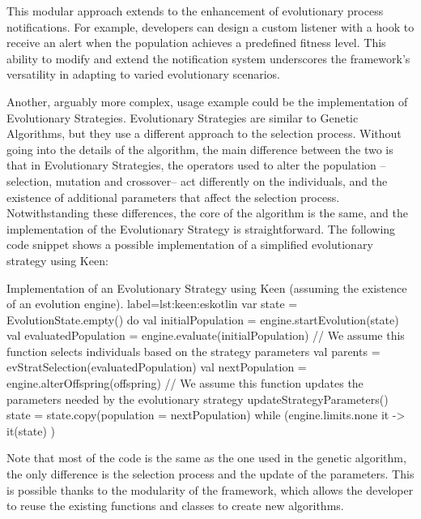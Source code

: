         This modular approach extends to the enhancement of evolutionary process notifications. For example, developers 
        can design a custom listener with a hook to receive an alert when the population achieves a predefined fitness 
        level. This ability to modify and extend the notification system underscores the framework's versatility in 
        adapting to varied evolutionary scenarios.

        Another, arguably more complex, usage example could be the implementation of Evolutionary Strategies. 
        Evolutionary Strategies are similar to Genetic Algorithms, but they use a different approach to the selection
        process. Without going into the details of the algorithm, the main difference between the two is that in
        Evolutionary Strategies, the operators used to alter the population --selection, mutation and crossover-- act 
        differently on the individuals, and the existence of additional parameters that affect the selection process.
        Notwithstanding these differences, the core of the algorithm is the same, and the implementation of the
        Evolutionary Strategy is straightforward. The following code snippet shows a possible implementation of a 
        simplified evolutionary strategy using Keen:

        \begin{code}{
        Implementation of an Evolutionary Strategy using Keen (assuming the existence of an evolution engine).
        }{label=lst:keen:es}{kotlin}
            var state = EvolutionState.empty()
            do {
                val initialPopulation = engine.startEvolution(state)
                val evaluatedPopulation = engine.evaluate(initialPopulation)
                // We assume this function selects individuals based on the strategy parameters
                val parents = evStratSelection(evaluatedPopulation)
                val nextPopulation = engine.alterOffspring(offspring)
                // We assume this function updates the parameters needed by the evolutionary strategy
                updateStrategyParameters()
                state = state.copy(population = nextPopulation)
            } while (engine.limits.none { it -> it(state) })
        \end{code}

        Note that most of the code is the same as the one used in the genetic algorithm, the only difference is the
        selection process and the update of the parameters. This is possible thanks to the modularity of the framework,
        which allows the developer to reuse the existing functions and classes to create new algorithms.
